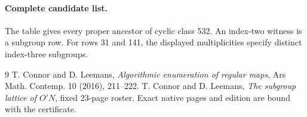 \documentclass[11pt,a4paper]{article}
\begin{document}
\paragraph{Complete candidate list.}
The table gives every proper ancestor of cyclic class 532. An
index-two witness is a subgroup row. For rows 31 and 141, the
displayed multiplicities specify distinct index-three subgroups.


\begin{thebibliography}{9}
 T. Connor and D. Leemans, \emph{Algorithmic enumeration
of regular maps}, Ars Math. Contemp. 10 (2016), 211--222.
 T. Connor and D. Leemans, \emph{The subgroup lattice
of $O'N$}, fixed 23-page roster. Exact native pages and edition are
bound with the certificate.
\end{thebibliography}
\end{document}
